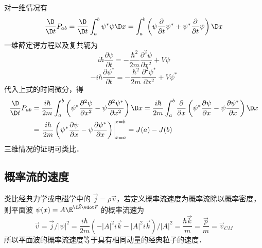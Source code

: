 对一维情况有
\begin{equation}
\frac{\D}{{\D t}}{P_{ab}} = \frac{\D}{{\D t}}\int_a^b {{\psi ^ * }\psi \D x}  = \int_a^b {\left( {\psi \frac{\partial }{{\partial t}}{\psi ^ * } + {\psi ^ * }\frac{\partial }{{\partial t}}\psi } \right)\D x}
\end{equation}
一维薛定谔方程以及复共轭为
\begin{equation}
i\hbar \frac{{\partial \psi }}{{\partial t}} =  - \frac{{{\hbar ^2}}}{{2m}}\frac{{{\partial ^2}\psi }}{{\partial {x^2}}} + V\psi
\end{equation}
\begin{equation}
 - i\hbar \frac{{\partial {\psi ^ * }}}{{\partial t}} =  - \frac{{{\hbar ^2}}}{{2m}}\frac{{{\partial ^2}{\psi ^ * }}}{{\partial {x^2}}} + V{\psi ^ * }
\end{equation}
代入上式的时间微分，得
\begin{equation}
\begin{aligned}
  \frac{\D}{{\D t}}{P_{ab}} &= \frac{{i\hbar }}{{2m}}\int_a^b {\left( {{\psi ^ * }\frac{{{\partial ^2}\psi }}{{\partial {x^2}}} - \psi \frac{{{\partial ^2}{\psi ^ * }}}{{\partial {x^2}}}} \right)\D x}  = \frac{{i\hbar }}{{2m}}\int_a^b {\frac{\partial }{{\partial x}}\left( {{\psi ^ * }\frac{{\partial \psi }}{{\partial x}} - \psi \frac{{\partial {\psi ^ * }}}{{\partial x}}} \right)\D x} \\
   &= \left. {\frac{{i\hbar }}{{2m}}\left( {{\psi ^ * }\frac{{\partial \psi }}{{\partial x}} - \psi \frac{{\partial {\psi ^ * }}}{{\partial x}}} \right)} \right|_{x = a}^{x = b} = J(a) - J(b)
\end{aligned}
\end{equation}
三维情况的证明可类比．

\subsection{概率流的速度}

类比经典力学或电磁学中的 $\vec j = \rho \vec v$，若定义概率流速度为概率流除以概率密度，则平面波 $\psi (x) = A{\E^{\I \vec k \vdot \vec r}}$ 的概率流速为
\begin{equation}
\vec v = \vec j/{\left| \psi  \right|^2} = \frac{{i\hbar }}{{2m}}\left( { - {{\left| A \right|}^2}i\vec k - {{\left| A \right|}^2}i\vec k} \right)/{\left| A \right|^2} = \frac{{\hbar \vec k}}{m} = \frac{{\vec p}}{m} = {\vec v_{CM}}
\end{equation}
所以平面波的概率流速度等于具有相同动量的经典粒子的速度．
